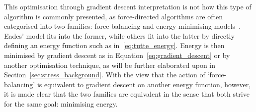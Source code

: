 This optimisation through gradient descent interpretation is not how this type of algorithm is commonly presented, as  force-directed algorithms are often categorised into two families: force-balancing and energy-minimising models~\cite{Ortmann2017, Brandes2001}.
Eades' model fits into the former, while others fit into the latter by directly defining an energy function such as in~\eqref{eq:tutte_energy}.
Energy is then minimised by gradient descent as in Equation~\eqref{eq:gradient_descent} or by another optimisation technique, as will be further elaborated upon in Section~\ref{sec:stress_background}.
With the view that the action of `force-balancing' is equivalent to gradient descent on another energy function, however, it is made clear that the two families are equivalent in the sense that both strive for the same goal: minimising energy.

